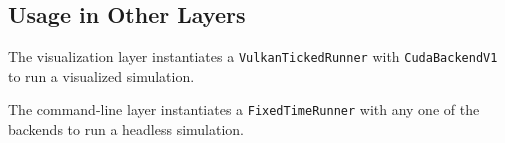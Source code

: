 


\subsection{Usage in Other Layers}
The visualization layer instantiates a \texttt{VulkanTickedRunner} with \texttt{CudaBackendV1} to run a visualized simulation.

The command-line layer instantiates a \texttt{FixedTimeRunner} with any one of the backends to run a headless simulation.